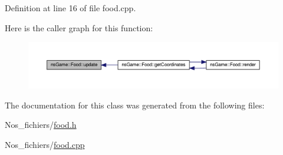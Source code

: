 Definition at line 16 of file food.\+cpp.

Here is the caller graph for this function\+:
\nopagebreak
\begin{figure}[H]
\begin{center}
\leavevmode
\includegraphics[width=350pt]{classns_game_1_1_food_a84b519ecca0f27b862878170e08c8731_icgraph}
\end{center}
\end{figure}


The documentation for this class was generated from the following files\+:\begin{DoxyCompactItemize}
\item 
Nos\+\_\+fichiers/\hyperlink{food_8h}{food.\+h}\item 
Nos\+\_\+fichiers/\hyperlink{food_8cpp}{food.\+cpp}\end{DoxyCompactItemize}
